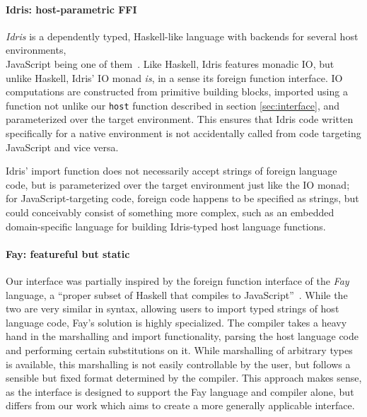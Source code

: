 \documentclass[preprint]{sigplanconf}
\begin{document}
\paragraph{Idris: host-parametric FFI}
\emph{Idris} is a dependently typed, Haskell-like language with backends for
several host environments,\\
JavaScript being one of them\ \cite{idris}.
Like Haskell, Idris features monadic IO, but unlike Haskell, Idris' IO monad
\emph{is}, in a sense its foreign function interface.
IO computations are constructed from primitive building blocks, imported using
a function not unlike our \lstinline!host! function described in section
\ref{sec:interface}, and parameterized over the target environment.
This ensures that Idris code written specifically for a native environment
is not accidentally called from code targeting JavaScript and vice versa.

Idris' import function does not necessarily accept strings of foreign
language code, but is parameterized over the target environment just like the
IO monad; for JavaScript-targeting code, foreign code happens to be specified
as strings, but could conceivably consist of something more complex, such as
an embedded domain-specific language for building Idris-typed host language
functions.

\paragraph{Fay: featureful but static}
Our interface was partially inspired by the foreign function interface of the
\emph{Fay} language,
a ``proper subset of Haskell that compiles to JavaScript''\ \cite{fay}.
While the two are very similar in syntax, allowing users to import typed
strings of host language code, Fay's solution is highly specialized.
The compiler takes a heavy hand in the marshalling and import functionality,
parsing the host language code and performing certain substitutions on it.
While marshalling of arbitrary types is available, this marshalling is not
easily controllable by the user, but follows a sensible but fixed format
determined by the compiler.
This approach makes sense, as the interface is designed to support the Fay
language and compiler alone, but differs from our work which aims to create
a more generally applicable interface.
\end{document}
